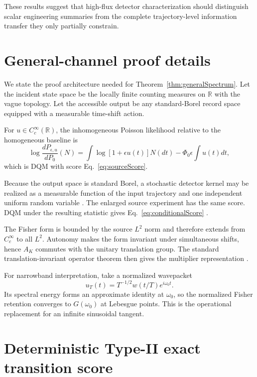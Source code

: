 \documentclass[aps,prapplied,preprint,nofootinbib]{revtex4-2}
\newcommand{\R}{\mathbb R}
\begin{document}
These results suggest that high-flux detector characterization should distinguish scalar engineering summaries from the complete trajectory-level information transfer they only partially constrain.

\appendix

\section{General-channel proof details}
\label{app:general}

We state the proof architecture needed for Theorem~\ref{thm:generalSpectrum}. Let the incident state space be the locally finite counting measures on $\R$ with the vague topology. Let the accessible output be any standard-Borel record space equipped with a measurable time-shift action.

For $u\in C_c^\infty(\R)$, the inhomogeneous Poisson likelihood relative to the homogeneous baseline is
\begin{equation}
\log\frac{dP_{\epsilon,u}}{dP_0}(N)
=
\int\log[1+\epsilon u(t)]N(dt)
-\Phi_0\epsilon\int u(t)dt,
\end{equation}
which is DQM with score Eq.~\eqref{eq:sourceScore}.

Because the output space is standard Borel, a stochastic detector kernel may be realized as a measurable function of the input trajectory and one independent uniform random variable \cite{Kallenberg2021}. The enlarged source experiment has the same score. DQM under the resulting statistic gives Eq.~\eqref{eq:conditionalScore} \cite{Pollard2013}.

The Fisher form is bounded by the source $L^2$ norm and therefore extends from $C_c^\infty$ to all $L^2$. Autonomy makes the form invariant under simultaneous shifts, hence $A_K$ commutes with the unitary translation group. The standard translation-invariant operator theorem then gives the multiplier representation \cite{Stein1970}.

For narrowband interpretation, take a normalized wavepacket
\begin{equation}
u_T(t)=T^{-1/2}w(t/T)e^{i\omega_0t}.
\end{equation}
Its spectral energy forms an approximate identity at $\omega_0$, so the normalized Fisher retention converges to $G(\omega_0)$ at Lebesgue points. This is the operational replacement for an infinite sinusoidal tangent.

\section{Deterministic Type-II exact transition score}
\label{app:detTypeII}
\end{document}
